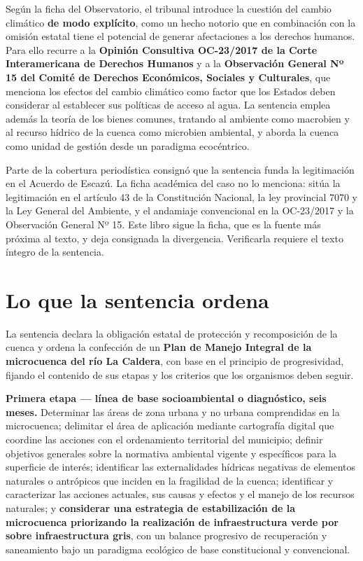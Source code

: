 Según la ficha del Observatorio, el tribunal introduce la cuestión del cambio climático \textbf{de modo explícito}, como un hecho notorio que en combinación con la omisión estatal tiene el potencial de generar afectaciones a los derechos humanos. Para ello recurre a la \textbf{Opinión Consultiva OC-23/2017 de la Corte Interamericana de Derechos Humanos} y a la \textbf{Observación General Nº 15 del Comité de Derechos Económicos, Sociales y Culturales}, que menciona los efectos del cambio climático como factor que los Estados deben considerar al establecer sus políticas de acceso al agua. La sentencia emplea además la teoría de los bienes comunes, tratando al ambiente como macrobien y al recurso hídrico de la cuenca como microbien ambiental, y aborda la cuenca como unidad de gestión desde un paradigma ecocéntrico.

\begin{cautela}
Parte de la cobertura periodística consignó que la sentencia funda la legitimación en el Acuerdo de Escazú. La ficha académica del caso no lo menciona: sitúa la legitimación en el artículo 43 de la Constitución Nacional, la ley provincial 7070 y la Ley General del Ambiente, y el andamiaje convencional en la OC-23/2017 y la Observación General Nº 15. Este libro sigue la ficha, que es la fuente más próxima al texto, y deja consignada la divergencia. Verificarla requiere el texto íntegro de la sentencia.
\end{cautela}

\section{Lo que la sentencia ordena}

La sentencia declara la obligación estatal de protección y recomposición de la cuenca y ordena la confección de un \textbf{Plan de Manejo Integral de la microcuenca del río La Caldera}, con base en el principio de progresividad, fijando el contenido de sus etapas y los criterios que los organismos deben seguir.

\textbf{Primera etapa --- línea de base socioambiental o diagnóstico, seis meses.} Determinar las áreas de zona urbana y no urbana comprendidas en la microcuenca; delimitar el área de aplicación mediante cartografía digital que coordine las acciones con el ordenamiento territorial del municipio; definir objetivos generales sobre la normativa ambiental vigente y específicos para la superficie de interés; identificar las externalidades hídricas negativas de elementos naturales o antrópicos que inciden en la fragilidad de la cuenca; identificar y caracterizar las acciones actuales, sus causas y efectos y el manejo de los recursos naturales; y \textbf{considerar una estrategia de estabilización de la microcuenca priorizando la realización de infraestructura verde por sobre infraestructura gris}, con un balance progresivo de recuperación y saneamiento bajo un paradigma ecológico de base constitucional y convencional.

